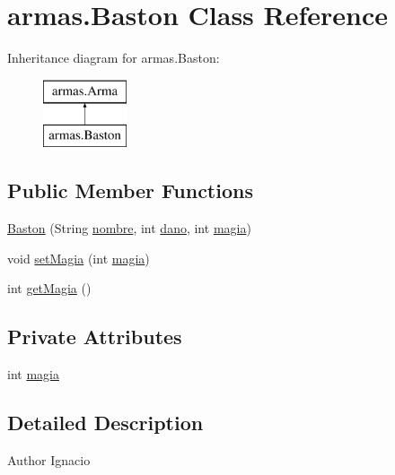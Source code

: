 \hypertarget{classarmas_1_1_baston}{}\section{armas.\+Baston Class Reference}
\label{classarmas_1_1_baston}
Inheritance diagram for armas.\+Baston\+:\begin{figure}[H]
\begin{center}
\leavevmode
\includegraphics[height=2.000000cm]{classarmas_1_1_baston}
\end{center}
\end{figure}
\subsection*{Public Member Functions}
\begin{DoxyCompactItemize}
\item 
\mbox{\hyperlink{classarmas_1_1_baston_adee851d9bd8ee95ce79b2b5c3087bcad}{Baston}} (String \mbox{\hyperlink{classarmas_1_1_arma_abdd717c561a99a3436dbfda8129b5581}{nombre}}, int \mbox{\hyperlink{classarmas_1_1_arma_a59396ee4b222360f19c8be08eb7d137b}{dano}}, int \mbox{\hyperlink{classarmas_1_1_baston_a36ffe8a19130123c5ef91918c2a5c2db}{magia}})
\item 
void \mbox{\hyperlink{classarmas_1_1_baston_a751769c59bb879f959b742e2176cbc8b}{set\+Magia}} (int \mbox{\hyperlink{classarmas_1_1_baston_a36ffe8a19130123c5ef91918c2a5c2db}{magia}})
\item 
int \mbox{\hyperlink{classarmas_1_1_baston_a40e5bbca49357a1b4a4cd4e010281a9c}{get\+Magia}} ()
\end{DoxyCompactItemize}
\subsection*{Private Attributes}
\begin{DoxyCompactItemize}
\item 
int \mbox{\hyperlink{classarmas_1_1_baston_a36ffe8a19130123c5ef91918c2a5c2db}{magia}}
\end{DoxyCompactItemize}


\subsection{Detailed Description}
\begin{DoxyAuthor}{Author}
Ignacio 
\end{DoxyAuthor}



